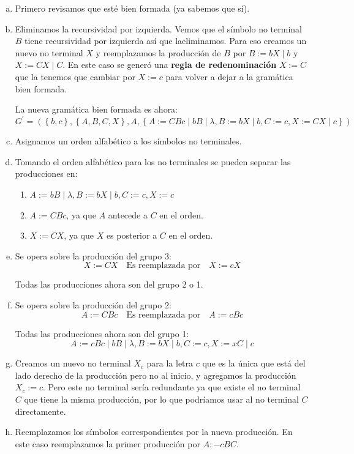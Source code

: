 \documentclass[12pt]{article}
\begin{document}
\begin{enumerate}[a)]
  \item Primero revisamos que esté bien formada (ya sabemos que sí).

  \item Eliminamos la recursividad por izquierda. Vemos que el símbolo no terminal $ B $ tiene recursividad por izquierda así que laeliminamos. Para eso creamos un nuevo no terminal $ X $ y reemplazamos la producción de $ B $ por $ B:=bX \mid b $ y $ X:=CX \mid C $. En este caso se generó una \textbf{regla de redenominación} $ X:=C $ que la tenemos que cambiar por $ X:=c $ para volver a dejar a la gramática bien formada.

  La nueva gramática bien formada es ahora:
  \[
  G^{\prime}=\left(\left\{b,c\right\},\left\{A,B,C,X\right\},A,\left\{A:=CBc \mid bB \mid \lambda, B:=bX \mid b,C:=c,X:=CX \mid c\right\}\right)
  \]

  \item Asignamos un orden alfabético a los símbolos no terminales.

  \item Tomando el orden alfabético para los no terminales se pueden separar las producciones en:
	  \begin{enumerate}[Grupo 1.]
	    \item $ A:=bB \mid \lambda, B:=bX \mid b,C:=c,X:=c $

	    \item $ A:=CBc $, ya que $ A $ antecede a $ C $ en el orden.

	    \item $ X:=CX $, ya que $ X $ es posterior a $ C $ en el orden.
	  \end{enumerate}

  \item Se opera sobre la producción del grupo 3:
	  \[
	  X:=CX \quad \text{Es reemplazada por} \quad X:=cX
	  \]
	  
	  Todas las producciones ahora son del grupo 2 o 1.

  \item Se opera sobre la producción del grupo 2:
	  \[
	  A:=CBc \quad \text{Es reemplazada por} \quad A:=cBc
	  \]

	  Todas las producciones ahora son del grupo 1:
	  \[
	  A:=cBc \mid bB \mid \lambda, B:=bX \mid b,C:=c,X:=xC \mid c
	  \]

  \item Creamos un nuevo no terminal $ X_{c} $ para la letra $ c $ que es la única que está del lado derecho de la producción pero no al inicio, y agregamos la producción $ X_{c}:=c $. Pero este no terminal sería redundante ya que existe el no terminal $ C $ que tiene la misma producción, por lo que podríamos usar al no terminal $ C $ directamente.

  \item Reemplazamos los símbolos correspondientes por la nueva producción. En este caso reemplazamos la primer producción por $ A:-cBC $.
\end{enumerate}
\end{document}
